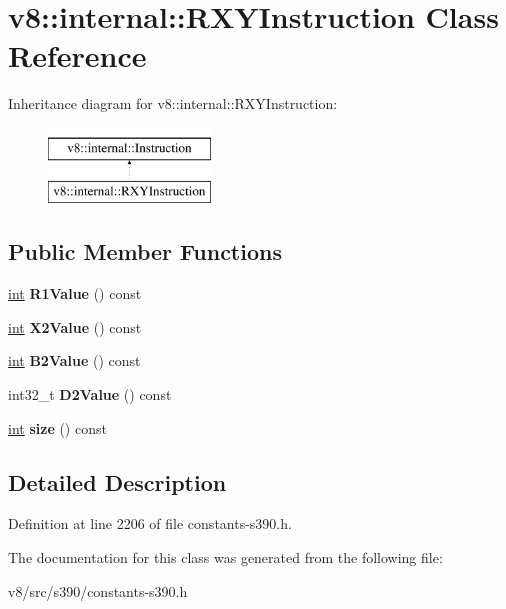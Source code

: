 \hypertarget{classv8_1_1internal_1_1RXYInstruction}{}\section{v8\+:\+:internal\+:\+:R\+X\+Y\+Instruction Class Reference}
\label{classv8_1_1internal_1_1RXYInstruction}
Inheritance diagram for v8\+:\+:internal\+:\+:R\+X\+Y\+Instruction\+:\begin{figure}[H]
\begin{center}
\leavevmode
\includegraphics[height=2.000000cm]{classv8_1_1internal_1_1RXYInstruction}
\end{center}
\end{figure}
\subsection*{Public Member Functions}
\begin{DoxyCompactItemize}
\item 
\mbox{\label{classv8_1_1internal_1_1RXYInstruction_a3350e95d15a62224ebff7f1229593526}} 
\mbox{\hyperlink{classint}{int}} {\bfseries R1\+Value} () const
\item 
\mbox{\label{classv8_1_1internal_1_1RXYInstruction_a9c48956d03e2677a9cb09c2ff107369d}} 
\mbox{\hyperlink{classint}{int}} {\bfseries X2\+Value} () const
\item 
\mbox{\label{classv8_1_1internal_1_1RXYInstruction_aa41c3d66a0ac00ceaffab00f7c2026cf}} 
\mbox{\hyperlink{classint}{int}} {\bfseries B2\+Value} () const
\item 
\mbox{\label{classv8_1_1internal_1_1RXYInstruction_a6739ea3b1ec8afb2acde93e9c0124439}} 
int32\+\_\+t {\bfseries D2\+Value} () const
\item 
\mbox{\label{classv8_1_1internal_1_1RXYInstruction_ac427c7a0404795c7f9cafbe9067550e3}} 
\mbox{\hyperlink{classint}{int}} {\bfseries size} () const
\end{DoxyCompactItemize}


\subsection{Detailed Description}


Definition at line 2206 of file constants-\/s390.\+h.



The documentation for this class was generated from the following file\+:\begin{DoxyCompactItemize}
\item 
v8/src/s390/constants-\/s390.\+h\end{DoxyCompactItemize}

